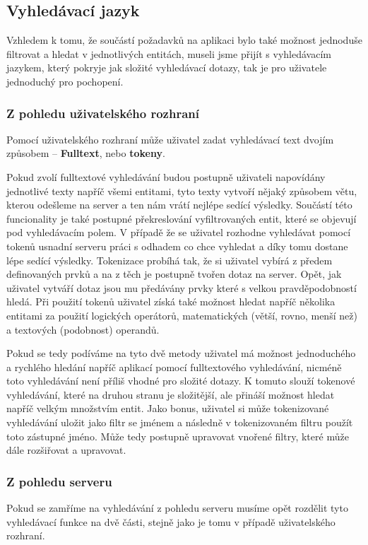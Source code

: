 \subsection{Vyhledávací jazyk}
\par Vzhledem k tomu, že součástí požadavků na aplikaci bylo také možnost jednoduše filtrovat a hledat v jednotlivých entitách, museli jsme přijít s vyhledávacím jazykem, který pokryje jak složité vyhledávací dotazy, tak je pro uživatele jednoduchý pro pochopení.

\subsubsection{Z pohledu uživatelského rozhraní}
\par Pomocí uživatelského rozhraní může uživatel zadat vyhledávací text dvojím způsobem -- \textbf{Fulltext}, nebo \textbf{tokeny}.

\par Pokud zvolí fulltextové vyhledávání  budou postupně uživateli napovídány jednotlivé texty napříč všemi entitami, tyto texty vytvoří nějaký způsobem větu, kterou odešleme na server a ten nám vrátí nejlépe sedící výsledky. Součástí této funcionality je také postupné překreslování vyfiltrovaných entit, které se objevují pod vyhledávacím polem. V případě že se uživatel rozhodne vyhledávat pomocí tokenů usnadní serveru práci s odhadem co chce vyhledat a díky tomu dostane lépe sedící výsledky. Tokenizace probíhá tak, že si uživatel vybírá z předem definovaných prvků a na z těch je postupně tvořen dotaz na server. Opět, jak uživatel vytváří dotaz jsou mu předávány prvky které s velkou pravděpodobností hledá. Při použití tokenů uživatel získá také možnost hledat napříč několika entitami za použití logických operátorů, matematických (větší, rovno, menší než) a textových (podobnost) operandů.

\par Pokud se tedy podíváme na tyto dvě metody uživatel má možnost jednoduchého a rychlého hledání napříč aplikací pomocí fulltextového vyhledávání, nicméně toto vyhledávání není příliš vhodné pro složité dotazy. K tomuto slouží tokenové vyhledávání, které na druhou stranu je složitější, ale přináší možnost hledat napříč velkým množstvím entit. Jako bonus, uživatel si může tokenizované vyhledávání uložit jako filtr se jménem a následně v tokenizovaném filtru použít toto zástupné jméno. Může tedy postupně upravovat vnořené filtry, které může dále rozšiřovat a upravovat.

\subsubsection{Z pohledu serveru}
\par Pokud se zamříme na vyhledávání z pohledu serveru musíme opět rozdělit tyto vyhledávací funkce na dvě části, stejně jako je tomu v případě uživatelského rozhraní.

